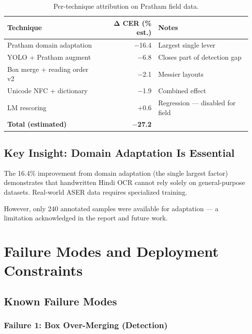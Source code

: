 \documentclass[14pt,a4paper]{article}
\begin{document}
\begin{table}[h]
    \centering
    \begin{tabular}{lrl}
        \toprule
        \textbf{Technique} & \textbf{Δ CER (\% est.)} & \textbf{Notes} \\
        \midrule
        Pratham domain adaptation & $-$16.4 & Largest single lever \\
        YOLO + Pratham augment & $-$6.8 & Closes part of detection gap \\
        Box merge + reading order v2 & $-$2.1 & Messier layouts \\
        Unicode NFC + dictionary & $-$1.9 & Combined effect \\
        LM rescoring & +0.6 & Regression --- disabled for field \\
        \midrule
        \textbf{Total (estimated)} & \textbf{$-$27.2} & \\
        \bottomrule
    \end{tabular}
    \caption{Per-technique attribution on Pratham field data.}
\end{table}

\subsection{Key Insight: Domain Adaptation Is Essential}

The 16.4\% improvement from domain adaptation (the single largest factor) demonstrates that handwritten Hindi OCR cannot rely solely on general-purpose datasets. Real-world ASER data requires specialized training.

However, only 240 annotated samples were available for adaptation --- a limitation acknowledged in the report and future work.
\newpage
\section{Failure Modes and Deployment Constraints}

\subsection{Known Failure Modes}

\subsubsection{Failure 1: Box Over-Merging (Detection)}
\end{document}
